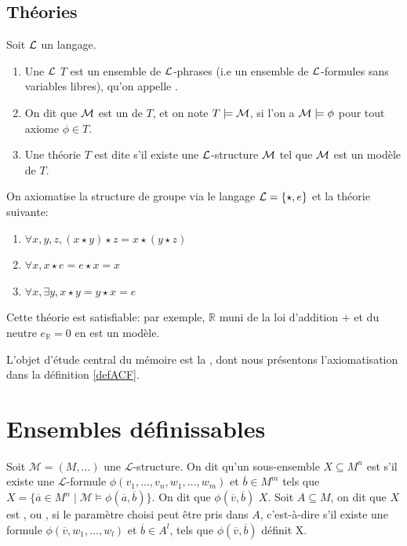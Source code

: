 \subsection{Théories}

\begin{defi}
Soit $\mathcal{L}$ un langage.
\begin{enumerate}
\item Une $\mathcal{L}$ $T$ est un ensemble de $\mathcal{L}$-phrases (i.e un ensemble de $\mathcal{L}$-formules sans variables libres), qu'on appelle .
\item On dit que $\mathcal{M}$ est un  de $T$, et on note $T \models \mathcal{M}$, si l'on a $\mathcal{M} \models \phi$ pour tout axiome $\phi \in T$.
\item Une théorie $T$ est dite  s'il existe une $\mathcal{L}$-structure $\mathcal{M}$ tel que $\mathcal{M}$ est un modèle de $T$.
\end{enumerate}
\end{defi}

\begin{exem}
On axiomatise la structure de groupe via le langage $\mathcal{L} = \{ \star , e \}$ et la théorie suivante:
\begin{enumerate}
\item $\forall x,y,z, (x \star y) \star z = x \star (y \star z)$
\item $\forall x, x \star e = e \star x = x$
\item $\forall x, \exists y, x \star y = y \star x = e$
\end{enumerate}
Cette théorie est satisfiable: par exemple, $\mathbb{R}$ muni de la loi d'addition $+$ et du neutre $e_{\mathbb{R}} = 0$ en est un modèle.
\end{exem}

\begin{exem}
L'objet d'étude central du mémoire est la ,
dont nous présentons l'axiomatisation dans la définition \ref{defACF}.
\end{exem}

\section{Ensembles définissables}
\begin{defi}
Soit $\mathcal{M} = (M,\dots)$ une $\mathcal{L}$-structure. On dit qu'un sous-ensemble $X \subseteq M^n$ est  s'il existe une 
$\mathcal{L}$-formule $\phi(v_1,\dots,v_n,w_1,\dots,w_m)$ et $\overline{b} \in M^m$ tels que $X= \{ \overline{a} \in M^n \mid \mathcal{M} \models 
\phi(\overline{a},\overline{b}) \}$. On dit que $\phi(\overline{v},\overline{b})$  $X$. Soit $A \subseteq 
M$, on dit que $X$ est , ou , si le paramètre choisi peut être pris dans $A$, c'est-à-dire s'il
existe une formule $\phi(\overline{v},w_1,\dots,w_l)$ et $\overline{b} \in A^l$, tels que $\phi(\overline{v},\overline{b})$ définit X.
\end{defi}


